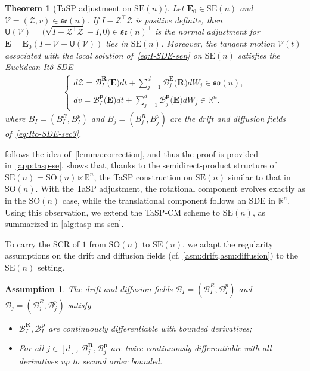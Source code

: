 \documentclass[11pt, a4paper, onecolumn]{article}
\newcommand{\SOn}{\mathrm{SO}(n)}
\newcommand{\son}{\mathfrak{so}(n)}
\newcommand{\SEn}{\mathrm{SE}(n)}
\newcommand{\sen}{\mathfrak{se}(n)}
\newcommand{\R}{\mathbb{R}}
\newcommand{\bfE}{\bf{E}}
\newcommand{\bfR}{\mathbf{R}}
\newcommand{\Z}{\mathcal{Z}}
\newcommand{\B}{\mathcal{B}}
\renewcommand{\bf}[1]{\mathbf{#1}}
\newcommand{\tg}[1]{\mathcal{#1}}
\newcommand{\nm}[1]{\mathsf{#1}}
\newtheorem{assumption}{Assumption}
\newtheorem{theorem}{Theorem}
\begin{document}
\begin{theorem}[TaSP adjustment on $\SEn$]
\label{thm:tasp-se}
Let $\bfE_0\in\SEn$ and $\tg V=(\tg Z,v)\in\sen$.
If $I-\tg Z^{\top}\Z$ is positive definite, then $\nm U(\tg V) = \bigl( \sqrt{I-\tg Z^{\top}\tg Z}-I,0\bigr) \in \sen^\perp$ is the normal adjustment for $\bfE=\bfE_0(I+\tg V+\nm U(\tg V))$ lies in $\SEn$. Moreover, the tangent motion $\tg V(t)$ associated with the local solution of~\cref{eq:I-SDE-sen} on $\SEn$ satisfies the Euclidean It\^o SDE
\begin{align}
    \begin{cases}
    d\mathcal Z =\mathcal B_I^{\bfR}\bigl(\bfE\bigr) dt +\sum_{j=1}^{d}\mathcal B_j^{\bfE}\bigl(\mathbf R\bigr)dW_j \in \son, \\
    dv = \B^{\bf p}_{I}\bigl(\bfE\bigr)dt + \sum_{j=1}^{d} \B^{\bf p}_{j}\bigl(\bfE\bigr) dW_{j}\in \R^n.
    \end{cases}
\end{align}
where $B_I=(B_I^{R},B_I^{p})$ and $B_j=(B_j^{R},B_j^{p})$ are the drift and diffusion fields of~\cref{eq:Ito-SDE-sec3}.
\end{theorem}

 follows the idea of~\cref{lemma:correction}, and thus the proof is  provided in~\cref{app:tasp-se}.  shows that, thanks to the semidirect-product structure of $\SEn=\SOn\ltimes\R^{n}$, the TaSP construction on $\SEn$ similar to that in $\SOn$. With the TaSP adjustment, the rotational component evolves exactly as in the $\SOn$ case, while the translational component follows an SDE in $\R^{n}$. Using this observation, we extend the TaSP-CM scheme to $\SEn$, as summarized in \cref{alg:tasp-ms-sen}.

To carry the SCR of $1$ from $\SOn$ to $\SEn$, we adapt the regularity assumptions on the drift and diffusion fields (cf. \cref{asm:drift,asm:diffusion}) to the $\SEn$ setting.
\begin{assumption}\label{as:reg-se}
The drift and diffusion fields
$\B_I=(\B_I^{R},\B_I^{p})$ and
$\B_j=(\B_j^{R},\B_j^{p})$ satisfy
\begin{itemize}
    \item [(i)]  $\B_I^{\bfR},\B_I^{\bf p}$ are continuously differentiable with bounded derivatives;
    \item [(ii)] For all $j\in[d]$, $\B_j^{\bfR},\B_j^{\bf p}$ are twice continuously differentiable with all derivatives up to second order bounded.
\end{itemize}
\end{assumption}
\end{document}
